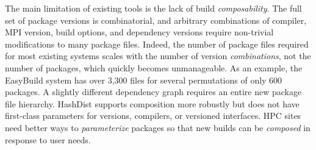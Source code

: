
The main limitation of existing tools is the lack of build {\it composability}.
The full set of package versions is combinatorial, and arbitrary combinations
of compiler, MPI version, build options, and dependency versions require
non-trivial modifications to many package files. Indeed, the number of package
files required for most existing systems scales with the number of version
{\it combinations}, not the number of packages, which quickly becomes
unmanageable.  As an example, the EasyBuild system has over 3,300 files for
several permutations of only 600 packages. A slightly different dependency
graph requires an entire new package file hierarchy.  HashDist supports
composition more robustly but does not have first-class parameters for
versions, compilers, or versioned interfaces.
%
HPC sites need better ways to {\it parameterize} packages so that new
builds can be {\it composed} in response to user needs.
%
